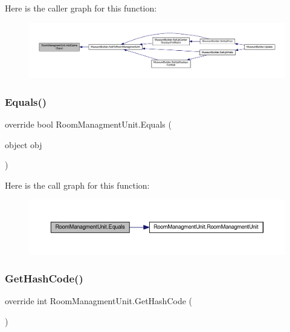 Here is the caller graph for this function\+:
\nopagebreak
\begin{figure}[H]
\begin{center}
\leavevmode
\includegraphics[width=350pt]{class_room_managment_unit_ac7f3f62eb0e6f9f0bb239266796a323a_icgraph}
\end{center}
\end{figure}
\mbox{\label{class_room_managment_unit_a663946fa33bad407b32d75aea8e7d5d9}} 
\subsubsection{\texorpdfstring{Equals()}{Equals()}}
{\footnotesize\ttfamily override bool Room\+Managment\+Unit.\+Equals (\begin{DoxyParamCaption}\item[{object}]{obj }\end{DoxyParamCaption})}

Here is the call graph for this function\+:
\nopagebreak
\begin{figure}[H]
\begin{center}
\leavevmode
\includegraphics[width=350pt]{class_room_managment_unit_a663946fa33bad407b32d75aea8e7d5d9_cgraph}
\end{center}
\end{figure}
\mbox{\label{class_room_managment_unit_ad76ae60e41c36a71934ff9cccca60039}} 
\subsubsection{\texorpdfstring{Get\+Hash\+Code()}{GetHashCode()}}
{\footnotesize\ttfamily override int Room\+Managment\+Unit.\+Get\+Hash\+Code (\begin{DoxyParamCaption}{ }\end{DoxyParamCaption})}

